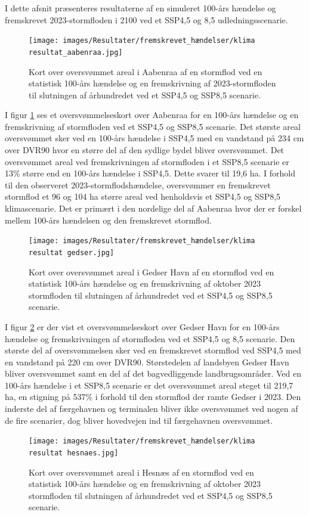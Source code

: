 I dette afsnit præsenteres resultaterne af en simuleret 100-års hændelse og fremskrevet 2023-stormfloden i 2100 ved et SSP4,5 og 8,5 udledningsscenarie. 
\begin{figure}[H]
    \centering
    \texttt{[image: images/Resultater/fremskrevet\_hændelser/klima resultat\_aabenraa.jpg]}
    \caption{Kort over oversvømmet areal i Aabenraa af en stormflod ved en statistisk 100-års hændelse og en fremskrivning af 2023-stormfloden til slutningen af århundredet ved et SSP4,5 og SSP8,5 scenarie.}
    \label{Figur: Klima Aabenraa}
\end{figure}
I figur \ref{Figur: Klima Aabenraa} ses et oversvømmelseskort over Aabenraa for en 100-års hændelse og en fremskrivning af stormfloden ved et SSP4,5 og SSP8,5 scenarie. Det største areal oversvømmet sker ved en 100-års hændelse i SSP4,5 med en vandstand på 234 cm over DVR90 hvor en større del af den sydlige bydel bliver oversvømmet. Det oversvømmet areal ved fremskrivningen af stormfloden i et SSP8,5 scenarie er 13\% større end en 100-års hændelse i SSP4,5. Dette svarer til 19,6 ha. I forhold til den observeret 2023-stormflodshændelse, oversvømmer en fremskrevet stormflod et 96 og 104 ha større areal ved henholdsvis et SSP4,5 og SSP8,5 klimascenarie. Det er primært i den nordelige del af Aabenraa hvor der er forskel mellem 100-års hændelsen og den fremskrevet stormflod.  
\begin{figure}[H]
    \centering
    \texttt{[image: images/Resultater/fremskrevet\_hændelser/klima resultat gedser.jpg]}
    \caption{Kort over oversvømmet areal i Gedser Havn af en stormflod ved en statistisk 100-års hændelse og en fremskrivning af oktober 2023 stormfloden til slutningen af århundredet ved et SSP4,5 og SSP8,5 scenarie.}
    \label{Figur: Klima Gedser Havn}
\end{figure}
I figur \ref{Figur: Klima Gedser Havn} er der vist et oversvømmelseskort over Gedser Havn for en 100-års hændelse og fremskrivningen af stormfloden ved et SSP4,5 og 8,5 scenarie. Den største del af oversvømmelsen sker ved en fremskrevet stormflod ved SSP4,5 med en vandstand på 220 cm over DVR90. Størstedelen af landsbyen Gedser Havn bliver oversvømmet samt en del af det bagvedliggende landbrugsområder. Ved en 100-års hændelse i et SSP8,5 scenarie er det oversvømmet areal steget til 219,7 ha, en stigning på 537\% i forhold til den stormflod der ramte Gedser i 2023. Den inderste del af færgehavnen og terminalen bliver ikke oversvømmet ved nogen af de fire scenarier, dog bliver hovedvejen ind til færgehavnen oversvømmet.
\begin{figure}[H]
    \centering
    \texttt{[image: images/Resultater/fremskrevet\_hændelser/klima resultat hesnaes.jpg]}
    \caption{Kort over oversvømmet areal i Hesnæs af en stormflod ved en statistisk 100-års hændelse og en fremskrivning af oktober 2023 stormfloden til slutningen af århundredet ved et SSP4,5 og SSP8,5 scenarie.}
    \label{Figur: Klima Hesnæs}
\end{figure}
